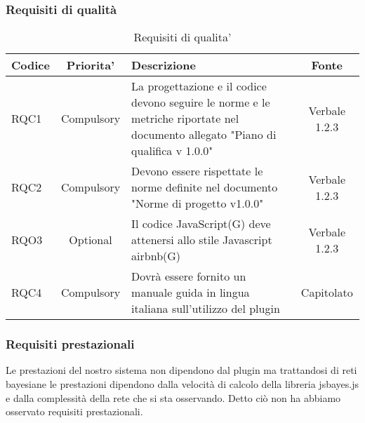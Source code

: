         \subsubsection{Requisiti di qualità}
        
        \begin{table}[h!]
            \centering
            \renewcommand{\arraystretch}{1.5} %
            \begin{tabular}{|l|c|p{8cm}|c|} %
                \rowcolor{orange!50} %
        		\hline
        		\textbf{Codice} & \textbf{Priorita'} & \textbf{Descrizione} & \textbf{Fonte}\\
                \hline
                RQC1 &  Compulsory & La  progettazione e il codice devono seguire le norme e le metriche riportate nel documento allegato "Piano di qualifica v 1.0.0" & Verbale 1.2.3\\
                \hline
                RQC2 &  Compulsory & Devono essere rispettate le norme definite nel documento "Norme di progetto v1.0.0" & Verbale 1.2.3\\
                \hline
                RQO3 &  Optional & Il codice JavaScript(G) deve attenersi allo stile Javascript airbnb(G) & Verbale 1.2.3\\
                \hline
                RQC4 &  Compulsory & Dovrà essere fornito un manuale guida in lingua italiana sull'utilizzo del plugin & Capitolato\\
                \hline
            \end{tabular}
            \caption{Requisiti di qualita'} %
            \label{tab:my_label}
        \end{table}
        
        
        \subsubsection{Requisiti prestazionali}
        Le prestazioni del nostro sistema non dipendono dal plugin ma trattandosi di reti bayesiane le prestazioni dipendono dalla velocità di calcolo della libreria jsbayes.js e dalla complessità della rete che si sta osservando. Detto ciò non ha abbiamo osservato requisiti prestazionali.


